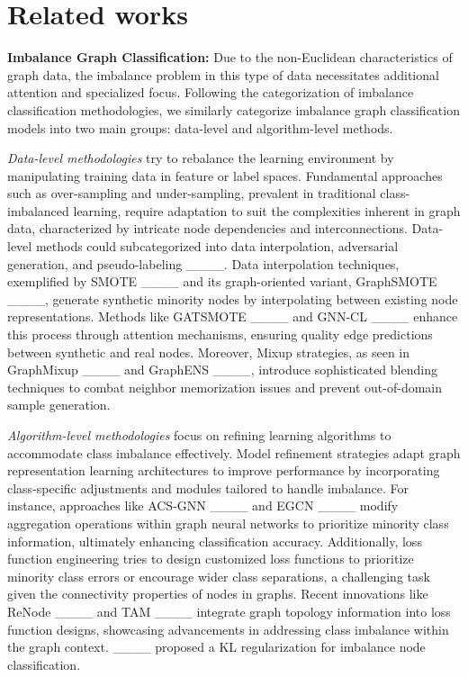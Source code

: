 \section{Related works}
\textbf{Imbalance Graph Classification:}
Due to the non-Euclidean characteristics of graph data, the imbalance problem in this type of data necessitates additional attention and specialized focus. Following the categorization of imbalance classification methodologies, we similarly categorize imbalance graph classification models into two main groups: data-level and algorithm-level methods.

\textit{Data-level methodologies} try to rebalance the learning environment by manipulating training data in feature or label spaces. Fundamental approaches such as over-sampling and under-sampling, prevalent in traditional class-imbalanced learning, require adaptation to suit the complexities inherent in graph data, characterized by intricate node dependencies and interconnections. Data-level methods could subcategorized into data interpolation, adversarial generation, and pseudo-labeling ____. Data interpolation techniques, exemplified by SMOTE ____ and its graph-oriented variant, GraphSMOTE ____, generate synthetic minority nodes by interpolating between existing node representations. Methods like GATSMOTE ____ and GNN-CL ____ enhance this process through attention mechanisms, ensuring quality edge predictions between synthetic and real nodes. Moreover, Mixup strategies, as seen in GraphMixup ____ and GraphENS ____, introduce sophisticated blending techniques to combat neighbor memorization issues and prevent out-of-domain sample generation.

\textit{Algorithm-level methodologies} focus on refining learning algorithms to accommodate class imbalance effectively. Model refinement strategies adapt graph representation learning architectures to improve performance by incorporating class-specific adjustments and modules tailored to handle imbalance. For instance, approaches like ACS-GNN ____ and EGCN ____ modify aggregation operations within graph neural networks to prioritize minority class information, ultimately enhancing classification accuracy. Additionally, loss function engineering tries to design customized loss functions to prioritize minority class errors or encourage wider class separations, a challenging task given the connectivity properties of nodes in graphs. Recent innovations like ReNode ____ and TAM ____ integrate graph topology information into loss function designs, showcasing advancements in addressing class imbalance within the graph context. ____ proposed a KL regularization for imbalance node classification.

